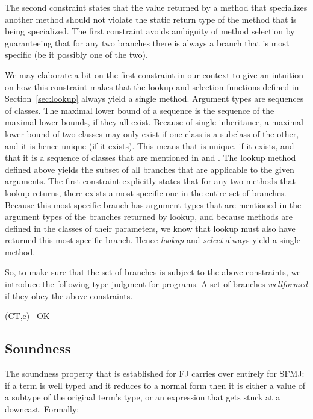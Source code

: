 \documentclass[11pt]{article}
\begin{document}
The second constraint states that the value returned by a method that specializes another method should not violate the static return type of the method that is being specialized. The first constraint avoids ambiguity of method selection by guaranteeing that for any two branches there is always a branch that is most specific (be it possibly one of the two). 

We may elaborate a bit on the first constraint in our context to give an intuition on how this constraint makes that the lookup and selection functions defined in Section~\ref{sec:lookup} always yield a single method. Argument types are sequences of classes. The maximal lower bound of a sequence is the sequence of the maximal lower bounds, if they all exist. Because of single inheritance, a maximal lower bound of two classes may only exist if one class is a subclass of the other, and it is hence unique (if it exists). This means that  is unique, if it exists, and that it is a sequence of classes that are mentioned in  and . The lookup method defined above yields the subset of all branches that are applicable to the given arguments. The first constraint explicitly states that for any two methods that lookup returns, there exists a most specific one in the entire set of branches. Because this most specific branch has argument types that are mentioned in the argument types of the branches returned by lookup, and because methods are defined in the classes of their parameters, we know that lookup must also have returned this most specific branch. Hence \emph{lookup} and \emph{select} always yield a single method.


So, to make sure that the set of branches is subject to the above constraints, we introduce the following type judgment for programs. A set of branches \textit{wellformed} if they obey the above constraints.

 {(CT,e) \ OK}



\subsection{Soundness}
\label{sec:soundness}

The soundness property that is established for FJ carries over entirely for SFMJ: if a term is well typed and it reduces to a normal form then it is either a value of a subtype of the original term's type, or an expression that gets stuck at a downcast. Formally:
\end{document}
